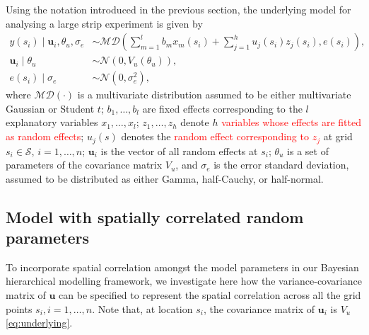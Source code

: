 \documentclass[a4paper]{article}   	%
\newcommand{\N}{\mathcal{N}}
\begin{document}
	Using the notation introduced in the previous section, the underlying model for analysing a large strip experiment is given by 
	\begin{equation}\label{eq:underlying}
		\begin{split}
			y(s_i)\mid \bm{u}_i,\theta_u,\sigma_e &\sim \mathcal{MD}\left( \sum_{m=1}^{l}b_m x_m(s_i) + \sum_{j=1}^{h}u_j(s_i)z_j(s_i),e(s_i)\right), \\
			\bm{u}_i \mid \theta_u &\sim \N(0,V_u(\theta_u)), \\
			e(s_i) \mid \sigma_e &\sim \N(0,\sigma_e^2), 
		\end{split}
	\end{equation}
	where $\mathcal{MD}(\cdot)$ is a multivariate distribution assumed to be either multivariate Gaussian or Student $t$; $b_1, \ldots, b_l$ are fixed effects corresponding to the $l$ explanatory variables $x_1,\ldots, x_l$; $z_1,\ldots, z_h$ denote $h$ \textcolor{red}{variables whose effects are fitted as random effects}; $u_j(s)$ denotes the \textcolor{red}{random effect corresponding to $z_j$} at grid $s_i\in\mathcal{S}$, $i=1,\ldots,n$; $\bm{u}_i$ is the vector of all random effects at $s_i$; $\theta_u$ is a set of parameters of the covariance matrix $V_u$, and $\sigma_e$ is the error standard deviation, assumed to be distributed as either Gamma, half-Cauchy, or half-normal. 
	
	
	
	\subsection{Model with spatially correlated random parameters}
	
	
	To incorporate spatial correlation amongst the model parameters in our Bayesian hierarchical modelling framework, we investigate here how the variance-covariance matrix of $\bm{u}$ can be specified to represent the spatial correlation across all the grid points $s_i, i=1,\ldots,n$. Note that, at location $s_i$, the covariance matrix of $\bm{u}_i$ is $V_u$ \eqref{eq:underlying}. %
	
\end{document}
